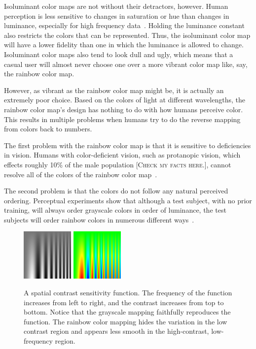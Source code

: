 \documentclass[twocolumn]{article}
\newcommand{\lcite}[1]{~\cite{#1}}
\newcommand{\sticky}[1]{\textsc{[#1]}}
\begin{document}
Isoluminant color maps are not without their detractors, however.  Human
perception is less sensitive to changes in saturation or hue than changes
in luminance, especially for high frequency data\lcite{Rogowitz96}.
Holding the luminance constant also restricts the colors that can be
represented.  Thus, the isoluminant color map will have a lower fidelity
than one in which the luminance is allowed to change.  Isoluminant color
maps also tend to look dull and ugly, which means that a casual user will
almost never choose one over a more vibrant color map like, say, the
rainbow color map.

However, as vibrant as the rainbow color map might be, it is actually an
extremely poor choice.  Based on the colors of light at different
wavelengths, the rainbow color map's design has nothing to do with how
humans perceive color.  This results in multiple problems when humans try
to do the reverse mapping from colors back to numbers.

The first problem with the rainbow color map is that it is sensitive to
deficiencies in vision.  Humans with color-deficient vision, such as
protanopic vision, which effects roughly 10\% of the male population
\sticky{Check my facts here.}, cannot resolve all of the colors of the
rainbow color map\lcite{Light04}.

The second problem is that the colors do not follow any natural perceived
ordering.  Perceptual experiments show that although a test subject, with
no prior training, will always order grayscale colors in order of luminance,
the test subjects will order rainbow colors in numerous different
ways\lcite{Ware04}.

\begin{figure}
  \centering
  \includegraphics[width=1.0in]{images/GrayscaleSpatialContrast}
  \qquad
  \includegraphics[width=1.0in]{images/RainbowSpatialContrast}
  \caption{A spatial contrast sensitivity function.  The frequency of the
    function increases from left to right, and the contrast increases from
    top to bottom.  Notice that the grayscale mapping faithfully reproduces
    the function.  The rainbow color mapping hides the variation in the low
    contrast region and appears less smooth in the high-contrast,
    low-frequency region.}
  \label{fig:RainbowSpatialContrast}
\end{figure}
\end{document}
